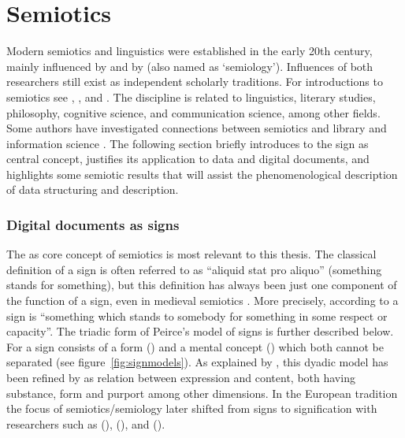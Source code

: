 \section{Semiotics}
\label{sec:semiotics}

Modern semiotics and linguistics were established in the early 20th century,
mainly influenced by  and by
 (also named as `semiology'). Influences of both
researchers still exist as independent scholarly traditions. For introductions
to semiotics see \textcite{Eco1976,Eco1977,Eco1984}, \textcite{Chandler2007},
and \textcite{Trabant1996}.  The discipline is related to linguistics, literary
studies, philosophy, cognitive science, and communication science, among other
fields. Some authors have investigated connections between semiotics and
library and information science
\cite{Brier2008,Brier2006,Huang2006,Raber2003,Warner1990,Mai2001}. The
following section briefly introduces to the sign as central concept, justifies
its application to data and digital documents, and highlights some semiotic
results that will assist the phenomenological description of data structuring
and description.

\subsubsection{Digital documents as signs}

The  as core concept of semiotics is most relevant to this thesis.
The classical definition of a sign is often referred to as ``aliquid stat pro
aliquo'' (something stands for something), but this definition has always been
just one component of the function of a sign, even in medieval semiotics
\cite{MeierOeser2011}. More precisely, according to \textcite[paragraph
2.228]{Peirce1931b} a sign is ``something which stands to somebody for
something in some respect or capacity''. The triadic form of Peirce's model of
signs is further described below.  For \textcite{Saussure1916} a sign consists
of a form () and a mental concept () which both
cannot be separated (see figure~\ref{fig:signmodels}). As explained by
\textcite{Taverniers2008}, this dyadic model has been refined by
\textcite{Hjelmslev1953} as relation between expression and content, both
having substance, form and purport among other dimensions.  In the European
tradition the focus of semiotics/semiology later shifted from signs to
signification with researchers such as 
(\citeyear{Barthes1967}), 
(\citeyear{Greimas1966}),  and  (\citeyear{Eco1984}).

